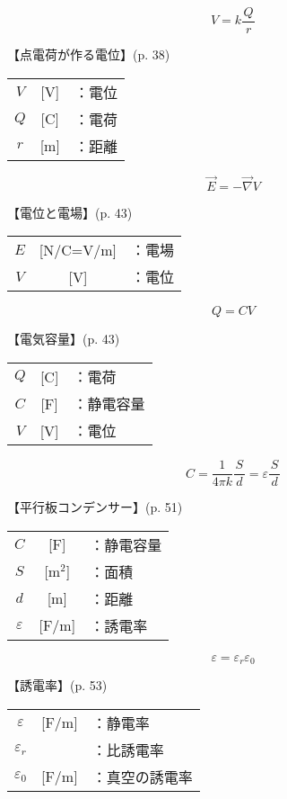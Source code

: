 \documentclass[10pt]{jarticle}
\begin{document}
\newpage
\[
V = k \frac{Q}{\; r \;}
\]


\vskip3mm
【点電荷が作る電位】{\footnotesize (p. 38)}

\begin{tabular}{ccl}
$V$	&[V]	&：電位 \\
$Q$	&[C]	&：電荷 \\
$r$	&[m]	&：距離
\end{tabular}



\newpage
\[
\vec{E} = - \vec{\nabla} V
\]


\vskip3mm
【電位と電場】{\footnotesize (p. 43)}

\begin{tabular}{ccl}
$E$	&[N/C=V/m]	&：電場 \\
$V$	&[V]	&：電位
\end{tabular}





\newpage
\[
Q = C V
\]


\vskip3mm
【電気容量】{\footnotesize (p. 43)}

\begin{tabular}{ccl}
$Q$	&[C]	&：電荷 \\
$C$	&[F]	&：静電容量 \\
$V$	&[V]	&：電位
\end{tabular}





\newpage
\[
C = \frac{1}{4\pi k} \frac{S}{\, d \,} = \varepsilon \frac{S}{\, d \,}
\]


\vskip3mm
【平行板コンデンサー】{\footnotesize (p. 51)}

\begin{tabular}{ccl}
$C$	&[F]	&：静電容量 \\
$S$	&[m$^2$]	&：面積 \\
$d$	&[m]	&：距離 \\
$\varepsilon$	&[F/m]	&：誘電率
\end{tabular}




\newpage
\[
\varepsilon = \varepsilon_r \varepsilon_0
\]


\vskip3mm
【誘電率】{\footnotesize (p. 53)}

\begin{tabular}{ccl}
$\varepsilon$	&[F/m]	&：静電率 \\
$\varepsilon_r$	&	&：比誘電率\\
$\varepsilon_0$	&[F/m]	&：真空の誘電率
\end{tabular}
\end{document}

